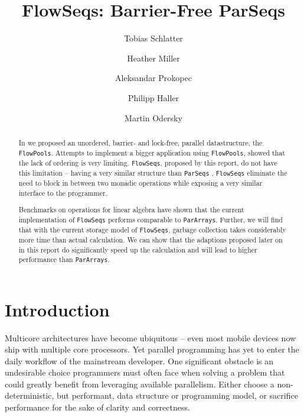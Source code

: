 \documentclass[runningheads,a4paper,fleqn]{llncs}
\begin{document}
\title{FlowSeqs: Barrier-Free ParSeqs}
\author{Tobias Schlatter \and Heather Miller \and
  Aleksandar Prokopec \and Philipp Haller \and Martin
  Odersky}



\graphicspath{{figs/}}

\newcommand{\plot}[1]{}

\maketitle

\begin{abstract}
  In \cite{FP12} we proposed an unordered, barrier- and lock-free,
  parallel datastructure, the \texttt{FlowPools}. Attempts to implement a
  bigger application using \texttt{FlowPools}, showed that the lack of ordering
  is very limiting. \texttt{FlowSeqs}, proposed by this report, do not have
  this limitation -- having a very similar structure than
  \texttt{ParSeqs} \cite{collect11}, \texttt{FlowSeqs} eliminate the need to block
  in between two monadic operations while exposing a very similar
  interface to the programmer.

  Benchmarks on operations for linear algebra have shown that the
  current implementation of \texttt{FlowSeqs} performs comparable to
  \texttt{ParArrays}. Further, we will find that with the current storage model
  of \texttt{FlowSeqs}, garbage collection takes considerably more time than
  actual calculation. We can show that
  the adaptions proposed later on in this report do significantly
  speed up the calculation and will lead to higher performance than
  \texttt{ParArrays}.
\end{abstract}

\section{Introduction}
Multicore architectures have become ubiquitous -- even most mobile devices now
ship with multiple core processors. Yet parallel programming has yet to enter
the daily workflow of the mainstream developer. One significant obstacle is an
undesirable choice programmers must often face when solving a problem that
could greatly benefit from leveraging available parallelism. Either choose a
non-deterministic, but performant, data structure or programming model, or
sacrifice performance for the sake of clarity and correctness.
\end{document}

